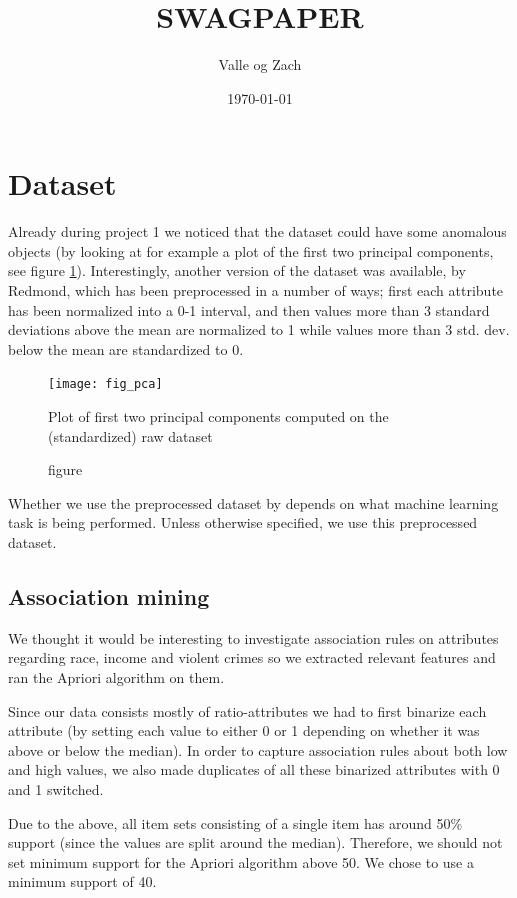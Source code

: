 \documentclass[a4paper]{article}
\title{SWAGPAPER}
\author{Valle og Zach}
\date{\today}
\begin{document}
\maketitle

\section{Dataset}
Already during project 1 we noticed that the dataset could have some anomalous objects (by looking at for example a plot of the first two principal components, see figure \ref{fig_pca}). Interestingly, another version of the dataset was available, by Redmond\cite{redmond09}, which has been preprocessed in a number of ways; first each attribute has been normalized into a 0-1 interval, and then values more than 3 standard deviations above the mean are normalized to 1 while values more than 3 std. dev. below the mean are standardized to 0.

\begin{figure}[H]
\centering
  \texttt{[image: fig\_pca]}
  \caption{figure}{Plot of first two principal components computed on the (standardized) raw dataset}
  \label{fig_pca}
\end{figure}

Whether we use the preprocessed dataset by \cite{redmond09} depends on what machine learning task is being performed. Unless otherwise specified, we use this preprocessed dataset.


\subsection{Association mining}
We thought it would be interesting to investigate association rules on attributes regarding race, income and violent crimes so we extracted relevant features and ran the Apriori algorithm on them.

Since our data consists mostly of ratio-attributes we had to first binarize each attribute (by setting each value to either 0 or 1 depending on whether it was above or below the median). In order to capture association rules about both low and high values, we also made duplicates of all these binarized attributes with 0 and 1 switched.

Due to the above, all item sets consisting of a single item has around 50\% support (since the values are split around the median). Therefore, we should not set minimum support for the Apriori algorithm above 50. We chose to use a minimum support of 40.
\end{document}

